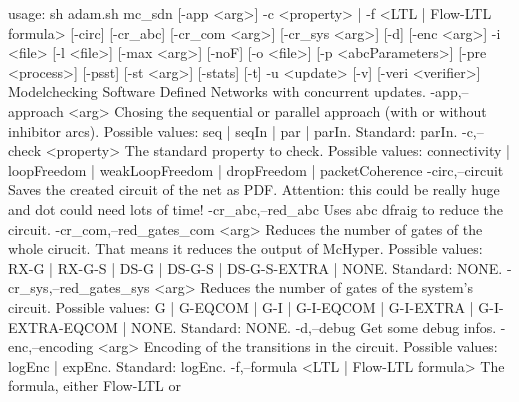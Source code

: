 usage: sh adam.sh mc_sdn [-app <arg>] -c <property> | -f <LTL | Flow-LTL
       formula> [-circ] [-cr_abc] [-cr_com <arg>] [-cr_sys <arg>] [-d]
       [-enc <arg>]  -i <file> [-l <file>] [-max <arg>] [-noF] [-o <file>]
       [-p <abcParameters>] [-pre <process>] [-psst] [-st <arg>] [-stats]
       [-t] -u <update> [-v] [-veri <verifier>]
Modelchecking Software Defined Networks with concurrent updates.
 -app,--approach <arg>                   Chosing the sequential or
                                         parallel approach (with or
                                         without inhibitor arcs). Possible
                                         values: seq | seqIn | par |
                                         parIn. Standard: parIn.
 -c,--check <property>                   The standard property to check.
                                         Possible values: connectivity |
                                         loopFreedom | weakLoopFreedom |
                                         dropFreedom | packetCoherence
 -circ,--circuit                         Saves the created circuit of the
                                         net as PDF. Attention: this could
                                         be really huge and dot could need
                                         lots of time!
 -cr_abc,--red_abc                       Uses abc dfraig to reduce the
                                         circuit.
 -cr_com,--red_gates_com <arg>           Reduces the number of gates of
                                         the whole cirucit. That means it
                                         reduces the output of McHyper.
                                         Possible values: RX-G | RX-G-S |
                                         DS-G | DS-G-S | DS-G-S-EXTRA |
                                         NONE. Standard: NONE.
 -cr_sys,--red_gates_sys <arg>           Reduces the number of gates of
                                         the system's circuit. Possible
                                         values: G | G-EQCOM | G-I |
                                         G-I-EQCOM | G-I-EXTRA |
                                         G-I-EXTRA-EQCOM | NONE. Standard:
                                         NONE.
 -d,--debug                              Get some debug infos.
 -enc,--encoding <arg>                   Encoding of the transitions in
                                         the circuit. Possible values:
                                         logEnc | expEnc. Standard:
                                         logEnc.
 -f,--formula <LTL | Flow-LTL formula>   The formula, either Flow-LTL or
